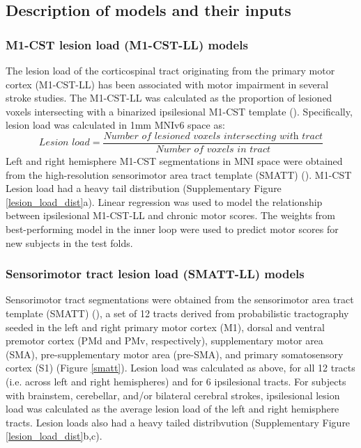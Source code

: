 \documentclass[10pt]{article}
\begin{document}
\subsection{Description of models and their inputs}
\subsubsection*{M1-CST lesion load (M1-CST-LL) models}

The lesion load of the corticospinal tract originating from the primary motor cortex (M1-CST-LL) has been associated with motor impairment in several stroke studies. The M1-CST-LL was calculated as the proportion of lesioned voxels intersecting with a binarized ipsilesional M1-CST template (\cite{Zhu2010-qh}). Specifically, lesion load was calculated in 1mm MNIv6 space as:
\begin{equation}
    \textit{Lesion load} = \frac{\textit{Number of lesioned voxels intersecting with  tract}}{\textit{Number of voxels in tract}}
\end{equation}
Left and right hemisphere M1-CST segmentations in MNI space were obtained from the high-resolution sensorimotor area tract template (SMATT) (\cite{Archer2018-ti}). M1-CST Lesion load had a heavy tail distribution (Supplementary Figure \ref{lesion_load_dist}a).
Linear regression was used to model the relationship between ipsilesional M1-CST-LL and chronic motor scores. The weights from best-performing model in the inner loop were used to predict motor scores for new subjects in the test folds. 

\subsubsection*{Sensorimotor tract lesion load  (SMATT-LL) models}
Sensorimotor tract segmentations were obtained from the sensorimotor area tract template (SMATT) (\cite{Archer2018-ti}), a set of 12 tracts derived from probabilistic tractography seeded in the left and right primary motor cortex (M1), dorsal and ventral premotor cortex (PMd and PMv, respectively), supplementary motor area (SMA), pre-supplementary motor area (pre-SMA), and primary somatosensory cortex (S1) (Figure \ref{smatt}). Lesion load was calculated as above, for all 12 tracts (i.e. across left and right hemispheres) and for 6 ipsilesional tracts. For subjects with brainstem, cerebellar, and/or bilateral cerebral strokes, ipsilesional lesion load was calculated as the average lesion load of the left and right hemisphere tracts. Lesion loads also had a heavy tailed distribvution (Supplementary Figure \ref{lesion_load_dist}b,c). 
\end{document}
